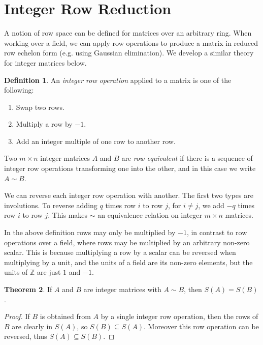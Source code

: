 \documentclass[12pt,a4paper,answers]{exam}
\newcommand{\Z}{\mathbb{Z}}
\theoremstyle{definition}
\newtheorem{theorem}{Theorem}[section]
\newtheorem{definition}[theorem]{Definition}
\begin{document}
\section{Integer Row Reduction}

A notion of row space can be defined for matrices over an arbitrary ring. When working over a field, we can apply row operations to produce a matrix in reduced row echelon form (e.g. using Gaussian elimination). We develop a similar theory for integer matrices below.

\begin{definition}
  An \emph{integer row operation} applied to a matrix is one of the following:
  \begin{enumerate}
  \item Swap two rows.
  \item Multiply a row by $-1$.
  \item Add an integer multiple of one row to another row.
  \end{enumerate}
  Two $m\times n$ integer matrices $A$ and $B$ are \emph{row equivalent} if there is a sequence of integer row operations transforming one into the other, and in this case we write $A\sim B$.
\end{definition}

We can reverse each integer row operation with another. The first two types are involutions. To reverse adding $q$ times row $i$ to row $j$, for $i\neq j$, we add $-q$ times row $i$ to row $j$. This makes $\sim$ an equivalence relation on integer $m\times n$ matrices.

In the above definition rows may only be multiplied by $-1$, in contrast to row operations over a field, where rows may be multiplied by an arbitrary non-zero scalar. This is because multiplying a row by a scalar can be reversed when multiplying by a unit, and the units of a field are its non-zero elements, but the units of $\Z$ are just $1$ and $-1$.

\begin{theorem}
  If $A$ and $B$ are integer matrices with $A\sim B$, then $S(A)=S(B)$.
\end{theorem}

\begin{proof}
  If $B$ is obtained from $A$ by a single integer row operation, then the rows of $B$ are clearly in $S(A)$, so $S(B)\subseteq S(A)$. Moreover this row operation can be reversed, thus $S(A)\subseteq S(B)$.
\end{proof}
\end{document}
